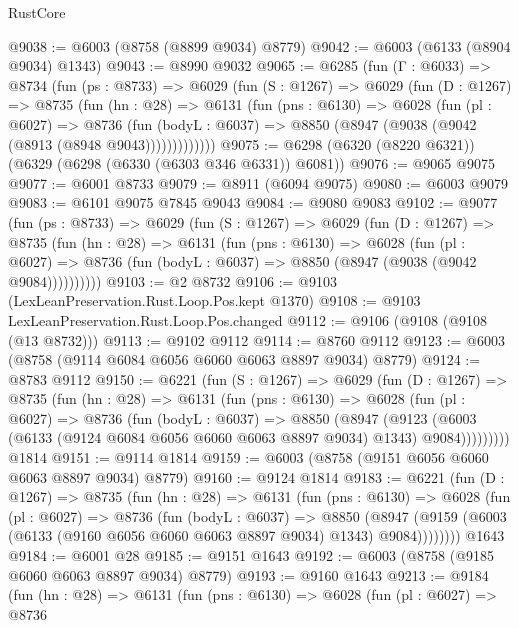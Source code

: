 \begin{lexlean}{RustCore}
\begin{coremodule}
{\begin{coremodule}
{{{{{{{{{{{{{{{{{{{{{{{{{{{{{{{{{{{{{{{{{{{{{{{@9038 := @6003 (@8758 (@8899 @9034) @8779)
@9042 := @6003 (@6133 (@8904 @9034) @1343)
@9043 := @8990 @9032
@9065 := @6285
    (fun (Γ : @6033) =>
    @8734
      (fun (ps : @8733) =>
      @6029
        (fun (S : @1267) =>
        @6029
          (fun (D : @1267) =>
          @8735
            (fun (hn : @28) =>
            @6131
              (fun (pns : @6130) =>
              @6028
                (fun (pl : @6027) =>
                @8736
                  (fun (bodyL : @6037) =>
                  @8850 (@8947 (@9038 (@9042 (@8913 (@8948 @9043)))))))))))))
@9075 := @6298 (@6320 (@8220 @6321)) (@6329 (@6298 (@6330 (@6303 @346 @6331)) @6081))
@9076 := @9065 @9075
@9077 := @6001 @8733
@9079 := @8911 (@6094 @9075)
@9080 := @6003 @9079
@9083 := @6101 @9075 @7845 @9043
@9084 := @9080 @9083
@9102 := @9077
    (fun (ps : @8733) =>
    @6029
      (fun (S : @1267) =>
      @6029
        (fun (D : @1267) =>
        @8735
          (fun (hn : @28) =>
          @6131
            (fun (pns : @6130) =>
            @6028
              (fun (pl : @6027) =>
              @8736 (fun (bodyL : @6037) => @8850 (@8947 (@9038 (@9042 @9084))))))))))
@9103 := @2 @8732
@9106 := @9103 (LexLeanPreservation.Rust.Loop.Pos.kept @1370)
@9108 := @9103 LexLeanPreservation.Rust.Loop.Pos.changed
@9112 := @9106 (@9108 (@9108 (@13 @8732)))
@9113 := @9102 @9112
@9114 := @8760 @9112
@9123 := @6003 (@8758 (@9114 @6084 @6056 @6060 @6063 @8897 @9034) @8779)
@9124 := @8783 @9112
@9150 := @6221
    (fun (S : @1267) =>
    @6029
      (fun (D : @1267) =>
      @8735
        (fun (hn : @28) =>
        @6131
          (fun (pns : @6130) =>
          @6028
            (fun (pl : @6027) =>
            @8736
              (fun (bodyL : @6037) =>
              @8850
                (@8947
                  (@9123
                    (@6003 (@6133 (@9124 @6084 @6056 @6060 @6063 @8897 @9034) @1343) @9084)))))))))
    @1814
@9151 := @9114 @1814
@9159 := @6003 (@8758 (@9151 @6056 @6060 @6063 @8897 @9034) @8779)
@9160 := @9124 @1814
@9183 := @6221
    (fun (D : @1267) =>
    @8735
      (fun (hn : @28) =>
      @6131
        (fun (pns : @6130) =>
        @6028
          (fun (pl : @6027) =>
          @8736
            (fun (bodyL : @6037) =>
            @8850
              (@8947 (@9159 (@6003 (@6133 (@9160 @6056 @6060 @6063 @8897 @9034) @1343) @9084))))))))
    @1643
@9184 := @6001 @28
@9185 := @9151 @1643
@9192 := @6003 (@8758 (@9185 @6060 @6063 @8897 @9034) @8779)
@9193 := @9160 @1643
@9213 := @9184
    (fun (hn : @28) =>
    @6131
      (fun (pns : @6130) =>
      @6028
        (fun (pl : @6027) =>
        @8736
}}}}}}}}}}}}}}}}}}}}}}}}}}}}}}}}}}}}}}}}}}}}}}}
\end{coremodule}}
\end{coremodule}
\end{lexlean}
